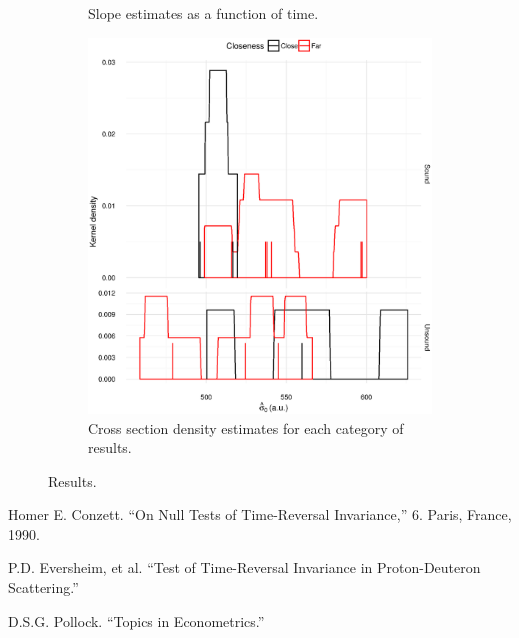 \documentclass[reprint]{revtex4-1}
\newcommand{\scl}{.4}
\begin{document}
\begin{figure}
\begin{subfigure}{.5\textwidth}
\caption{Slope estimates as a function of time.\label{fig:Slopes}}
\end{subfigure}
\begin{subfigure}{.5\textwidth}
\includegraphics[scale=\scl]{img/Cross-Section_dens.eps}
\caption{Cross section density estimates for each category of results.\label{fig:CS-dens}}
\end{subfigure}
\caption{Results.}
\end{figure}


\begin{thebibliography}{9}
Homer E. Conzett. ``On Null Tests of Time-Reversal Invariance,'' 6. Paris, France, 1990. %

P.D. Eversheim, et al. ``Test of Time-Reversal Invariance in Proton-Deuteron Scattering.''

D.S.G. Pollock. ``Topics in Econometrics.'' %

\end{thebibliography}
\end{document}
